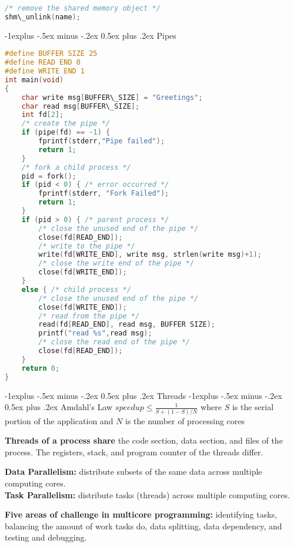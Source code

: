 \documentclass[letterpaper, 8pt]{extarticle}
\makeatletter
\renewcommand{\section}{\@startsection{section}{1}{0mm}%
                                {-1explus -.5ex minus -.2ex}%
                                {0.5ex plus .2ex}%
                                {\normalfont\normalsize\bfseries}}
\renewcommand{\subsection}{\@startsection{subsection}{2}{0mm}%
                                {-1explus -.5ex minus -.2ex}%
                                {0.5ex plus .2ex}%
                                {\normalfont\small\bfseries}}
\makeatother
\begin{document}
\begin{multicols*}{6}
\begin{lstlisting}[language=C]
/* remove the shared memory object */
shm\_unlink(name);
\end{lstlisting}

    \subsection{Pipes}
    \begin{lstlisting}[language=C]
#define BUFFER SIZE 25
#define READ END 0
#define WRITE END 1
int main(void)
{
    char write msg[BUFFER\_SIZE] = "Greetings";
    char read msg[BUFFER\_SIZE];
    int fd[2];
    /* create the pipe */
    if (pipe(fd) == -1) {
        fprintf(stderr,"Pipe failed");
        return 1;
    }
    /* fork a child process */
    pid = fork();
    if (pid < 0) { /* error occurred */
        fprintf(stderr, "Fork Failed");
        return 1;
    }
    if (pid > 0) { /* parent process */
        /* close the unused end of the pipe */
        close(fd[READ_END]);
        /* write to the pipe */
        write(fd[WRITE_END], write msg, strlen(write msg)+1);
        /* close the write end of the pipe */
        close(fd[WRITE_END]);
    }
    else { /* child process */
        /* close the unused end of the pipe */
        close(fd[WRITE_END]);
        /* read from the pipe */
        read(fd[READ_END], read msg, BUFFER SIZE);
        printf("read %s",read msg);
        /* close the read end of the pipe */
        close(fd[READ_END]);
    }
    return 0;
}
\end{lstlisting}
    \section{Threads}
    \subsection{Amdahl's Law}
    $speedup \leq \frac{1}{S+(1-S)/N}$ where $S$ is the serial
    portion of the application and $N$ is the number of processing cores

    \textbf{Threads of a process share} the code section, data section, and files
    of the process. The registers, stack, and program counter of the threads
    differ.

    \textbf{Data Parallelism:} distribute subsets of the same data across multiple
    computing cores. \\
    \textbf{Task Parallelism:} distribute tasks (threads) across multiple
    computing cores.

    \textbf{Five areas of challenge in multicore programming:} identifying tasks,
    balancing the amount of work tasks do, data splitting, data dependency,
    and testing and debugging.


\end{multicols*}
\end{document}

